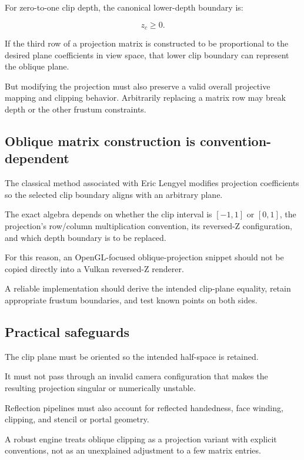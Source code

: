 For zero-to-one clip depth, the canonical lower-depth boundary is:

\[
 z_c\ge0.
\]

If the third row of a projection matrix is constructed to be proportional to the desired plane coefficients in view space, that lower clip boundary can represent the oblique plane.

But modifying the projection must also preserve a valid overall projective mapping and clipping behavior. Arbitrarily replacing a matrix row may break depth or the other frustum constraints.

\subsection{Oblique matrix construction is convention-dependent}\label{02-foundations-ii-ch034-oblique-matrix-construction-is-convention-dependent}

The classical method associated with Eric Lengyel modifies projection coefficients so the selected clip boundary aligns with an arbitrary plane.

The exact algebra depends on whether the clip interval is \([-1,1]\) or \([0,1]\), the projection's row/column multiplication convention, its reversed-Z configuration, and which depth boundary is to be replaced.

For this reason, an OpenGL-focused oblique-projection snippet should not be copied directly into a Vulkan reversed-Z renderer.

A reliable implementation should derive the intended clip-plane equality, retain appropriate frustum boundaries, and test known points on both sides.

\subsection{Practical safeguards}\label{02-foundations-ii-ch034-practical-safeguards}

The clip plane must be oriented so the intended half-space is retained.

It must not pass through an invalid camera configuration that makes the resulting projection singular or numerically unstable.

Reflection pipelines must also account for reflected handedness, face winding, clipping, and stencil or portal geometry.

A robust engine treats oblique clipping as a projection variant with explicit conventions, not as an unexplained adjustment to a few matrix entries.

